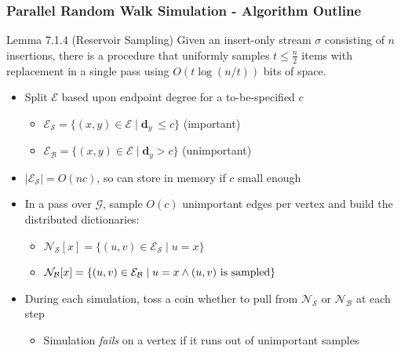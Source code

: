 \documentclass{beamer}
\begin{document}
\begin{frame}
\frametitle{Parallel Random Walk Simulation - Algorithm Outline}

\begin{block}{Lemma 7.1.4 (Reservoir Sampling)}
Given an insert-only stream $\sigma$ consisting of $n$ insertions, there is a procedure that uniformly samples $t \leq \frac{n}{2}$ items with replacement in a single pass using $O(t\log(n/t))$ bits of space. 
\end{block}

\begin{itemize}
	\item Split $\mathcal{E}$ based upon endpoint degree for a to-be-specified $c$
	\begin{itemize}
		\item $\mathcal{E}_\mathcal{S} = \{(x, y) \in \mathcal{E} \mid \mathbf{d}_y \ \leq c \}$ (important)
		\item $\mathcal{E}_\mathcal{B} = \{(x, y) \in \mathcal{E} \mid \mathbf{d}_y > c \}$ (unimportant)
	\end{itemize}
	\item $|\mathcal{E}_\mathcal{S}| = O(nc)$, so can store in memory if $c$ small enough
	\item In a pass over $\mathcal{G}$, sample $O(c)$ unimportant edges per vertex and build the distributed dictionaries:
	\begin{itemize}
		\item $\mathcal{N}_\mathcal{S}[x] = \{(u, v) \in \mathcal{E}_\mathcal{S} \mid u = x \}$
		\item $\mathcal{N}_\mathcal{B}[x]= \{(u, v) \in \mathcal{E}_\mathcal{B} \mid u = x \wedge \textnormal{$(u, v)$ is sampled} \}$
	\end{itemize}
	\item During each simulation, toss a coin whether to pull from $\mathcal{N}_\mathcal{S}$ or $\mathcal{N}_\mathcal{B}$ at each step
	\begin{itemize}
		\item Simulation \emph{fails} on a vertex if it runs out of unimportant samples
	\end{itemize}
\end{itemize}





\end{frame}
\end{document}
